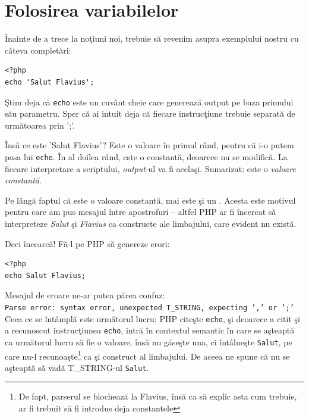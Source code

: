 \section{Folosirea variabilelor}
Înainte de a trece la noţiuni noi, trebuie să revenim asupra exemplului nostru
cu câteva completări:
\begin{lstlisting}
<?php
echo 'Salut Flavius';
\end{lstlisting}
Ştim deja că \texttt{echo} este un cuvânt cheie care generează output pe baza
primului său parametru. Sper că ai intuit deja că fiecare instrucţiune
trebuie separată de următoarea prin ';'.

Însă ce este 'Salut Flavius'? Este o valoare în primul rând, pentru că
i-o putem pasa lui \texttt{echo}. În al doilea rând, este o constantă,
deoarece nu se modifică. La fiecare interpretare a scriptului, \textit{output}-ul
va fi acelaşi. Sumarizat: este o \textsl{valoare constantă}.

Pe lângă faptul că este o valoare constantă, mai este şi un .
Acesta este motivul pentru care
am pus mesajul între apostrofuri -- altfel PHP ar fi încercat să
interpreteze \textsl{Salut} şi \textsl{Flavius} ca constructe ale limbajului,
care evident nu există.


Deci încearcă! Fă-l pe PHP să genereze erori:
\begin{lstlisting}
<?php
echo Salut Flavius;
\end{lstlisting}
Mesajul de eroare ne-ar putea părea confuz:\\
\texttt{Parse error: syntax error, unexpected T\_STRING, expecting ',' or ';'}\\
Ceea ce se întâmplă este următorul lucru: PHP citeşte \texttt{echo}, şi deoarece a citit
şi a recunoscut instrucţiunea \texttt{echo}, intră în contextul semantic în care se aşteaptă ca următorul
lucru să fie o valoare, însă nu găseşte una, ci întâlneşte \texttt{Salut},
pe care nu-l recunoaşte\footnote{De fapt, parserul se blochează la {\glqq}Flavius{\grqq}, însă
ca să explic asta cum trebuie, ar fi trebuit să fi introdus deja constantele}
ca şi construct al limbajului.
De aceea ne spune că nu se aşteaptă să vadă T\_STRING-ul \texttt{Salut}.


